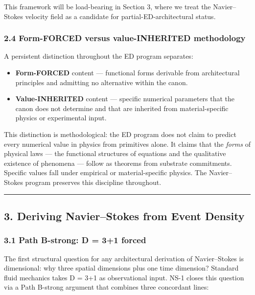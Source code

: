 \documentclass[
  11pt,a4paper]{article}
\providecommand{\tightlist}{%
  \setlength{\itemsep}{0pt}\setlength{\parskip}{0pt}}
\begin{document}
This framework will be load-bearing in Section 3, where we treat the
Navier--Stokes velocity field as a candidate for
partial-ED-architectural status.

\subsubsection{2.4 Form-FORCED versus value-INHERITED
methodology}\label{form-forced-versus-value-inherited-methodology}

A persistent distinction throughout the ED program separates:

\begin{itemize}
\tightlist
\item
  \textbf{Form-FORCED} content --- functional forms derivable from
  architectural principles and admitting no alternative within the
  canon.
\item
  \textbf{Value-INHERITED} content --- specific numerical parameters
  that the canon does not determine and that are inherited from
  material-specific physics or experimental input.
\end{itemize}

This distinction is methodological: the ED program does not claim to
predict every numerical value in physics from primitives alone. It
claims that the \emph{forms} of physical laws --- the functional
structures of equations and the qualitative existence of phenomena ---
follow as theorems from substrate commitments. Specific values fall
under empirical or material-specific physics. The Navier--Stokes program
preserves this discipline throughout.

\begin{center}\rule{0.5\linewidth}{0.5pt}\end{center}

\subsection{3. Deriving Navier--Stokes from Event
Density}\label{deriving-navierstokes-from-event-density}

\subsubsection{3.1 Path B-strong: D = 3+1
forced}\label{path-b-strong-d-31-forced}

The first structural question for any architectural derivation of
Navier--Stokes is dimensional: why three spatial dimensions plus one
time dimension? Standard fluid mechanics takes D = 3+1 as observational
input. NS-1 closes this question via a Path B-strong argument that
combines three concordant lines:
\end{document}
